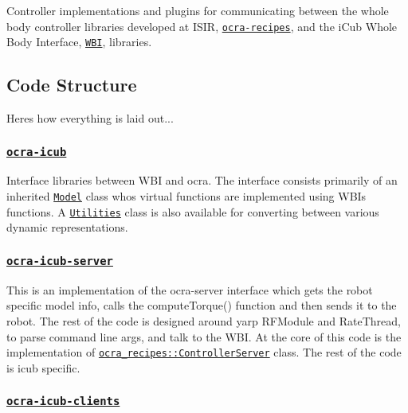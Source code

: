 Controller implementations and plugins for communicating between the whole body controller libraries developed at I\+S\+IR, \href{https://github.com/ocra-recipes/ocra-recipes}{\tt {\ttfamily ocra-\/recipes}}, and the i\+Cub Whole Body Interface, \href{https://github.com/robotology/wholebodyinterface}{\tt {\ttfamily W\+BI}}, libraries.

\subsection*{Code Structure}

Here\textquotesingle{}s how everything is laid out...

\subsubsection*{\href{https://github.com/ocra-recipes/ocra-wbi-plugins/tree/master/ocra-icub}{\tt ocra-\/icub}}

Interface libraries between W\+BI and ocra. The interface consists primarily of an inherited \href{https://github.com/ocra-recipes/ocra-wbi-plugins/tree/master/ocra-icub/src/ocraWbiModel.cpp}{\tt {\ttfamily Model}} class who\textquotesingle{}s virtual functions are implemented using W\+BI\textquotesingle{}s functions. A \href{https://github.com/ocra-recipes/ocra-wbi-plugins/tree/master/ocra-icub/src/Utilities.cpp}{\tt {\ttfamily Utilities}} class is also available for converting between various dynamic representations.

\subsubsection*{\href{https://github.com/ocra-recipes/ocra-wbi-plugins/tree/master/ocra-icub-server}{\tt ocra-\/icub-\/server}}

This is an implementation of the ocra-\/server interface which gets the robot specific model info, calls the {\ttfamily compute\+Torque()} function and then sends it to the robot. The rest of the code is designed around yarp {\ttfamily R\+F\+Module} and {\ttfamily Rate\+Thread}, to parse command line args, and talk to the W\+BI. At the core of this code is the implementation of \href{https://github.com/ocra-recipes/ocra-recipes/tree/master/ocra-recipes/src/ContControllerServer.cpp}{\tt {\ttfamily ocra\+\_\+recipes\+::\+Controller\+Server}} class. The rest of the code is icub specific.

\subsubsection*{\href{https://github.com/ocra-recipes/ocra-wbi-plugins/tree/master/ocra-icub-clients}{\tt ocra-\/icub-\/clients}}

